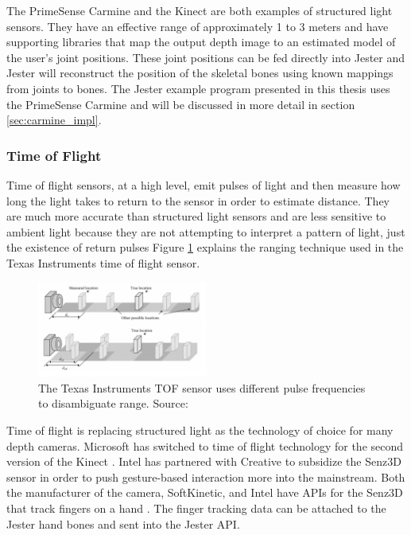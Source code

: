 The PrimeSense Carmine and the Kinect are both examples of structured light sensors. They have an effective range of approximately 1 to 3 meters and have supporting libraries that map the output depth image to an estimated model of the user’s joint positions. These joint positions can be fed directly into Jester and Jester will reconstruct the position of the skeletal bones using known mappings from joints to bones. The Jester example program presented in this thesis uses the PrimeSense Carmine and will be discussed in more detail in section \ref{sec:carmine_impl}.

\subsubsection{Time of Flight}

Time of flight sensors, at a high level, emit pulses of light and then measure how long the light takes to return to the sensor in order to estimate distance. They are much more accurate than structured light sensors and are less sensitive to ambient light because they are not attempting to interpret a pattern of light, just the existence of return pulses \cite{litime} Figure \ref{fig:tof} explains the ranging technique used in the Texas Instruments time of flight sensor. 

\begin{figure}[]
\centering
\includegraphics[width=0.5\textwidth]{figures/tilight}
\caption{The Texas Instruments TOF sensor uses different pulse frequencies to disambiguate range. Source: \cite{litime}}
\label{fig:tof}
\end{figure}

Time of flight is replacing structured light as the technology of choice for many depth cameras. Microsoft has switched to time of flight technology for the second version of the Kinect \cite{kinect2}. Intel has partnered with Creative to subsidize the Senz3D sensor in order to push gesture-based interaction more into the mainstream. Both the manufacturer of the camera, SoftKinetic, and Intel have APIs for the Senz3D that track fingers on a hand \cite{senz3d}. The finger tracking data can be attached to the Jester hand bones and sent into the Jester API.

